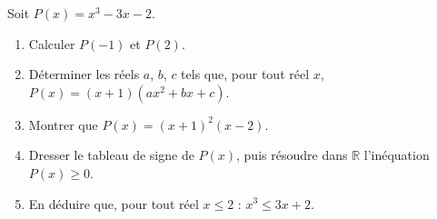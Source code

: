 
\newcommand{\R}{\mathbb{R}}
\newcommand{\vect}[1]{\overrightarrow{#1}}

Soit $P(x)=x^3-3x-2$.
\begin{enumerate}
  \item Calculer $P(-1)$ et $P(2)$.
  \item Déterminer les réels $a$, $b$, $c$ tels que, pour tout réel $x$, $P(x)=(x+1)(ax^2+bx+c)$.
  \item Montrer que $P(x)=(x+1)^2(x-2)$.
  \item Dresser le tableau de signe de $P(x)$, puis résoudre dans $\R$ l'inéquation $P(x)\geq0$.
  \item En déduire que, pour tout réel $x\leq2$ : $x^3\leq3x+2$.
\end{enumerate}

